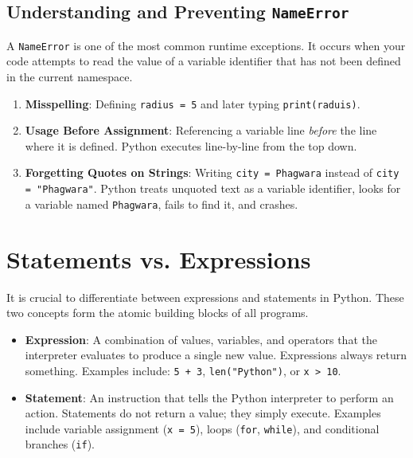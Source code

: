 \subsection{Understanding and Preventing \texttt{NameError}}

A \texttt{NameError} is one of the most common runtime exceptions. It occurs when your code attempts to read the value of a variable identifier that has not been defined in the current namespace.

\begin{commonmistake}
\begin{enumerate}[leftmargin=1.5em]
    \item \textbf{Misspelling}: Defining \texttt{radius = 5} and later typing \texttt{print(raduis)}.
    \item \textbf{Usage Before Assignment}: Referencing a variable line \textit{before} the line where it is defined. Python executes line-by-line from the top down.
    \item \textbf{Forgetting Quotes on Strings}: Writing \texttt{city = Phagwara} instead of \texttt{city = "Phagwara"}. Python treats unquoted text as a variable identifier, looks for a variable named \texttt{Phagwara}, fails to find it, and crashes.
\end{enumerate}
\end{commonmistake}

\section{Statements vs. Expressions}

It is crucial to differentiate between expressions and statements in Python. These two concepts form the atomic building blocks of all programs.

\begin{itemize}[leftmargin=1.5em]
    \item \textbf{Expression}: A combination of values, variables, and operators that the interpreter evaluates to produce a single new value. Expressions always return something. Examples include: \texttt{5 + 3}, \texttt{len("Python")}, or \texttt{x > 10}.
    \item \textbf{Statement}: An instruction that tells the Python interpreter to perform an action. Statements do not return a value; they simply execute. Examples include variable assignment (\texttt{x = 5}), loops (\texttt{for}, \texttt{while}), and conditional branches (\texttt{if}).
\end{itemize}

